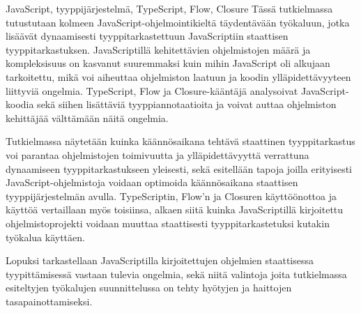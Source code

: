 \documentclass[a4paper, 12pt]{report}
\begin{document}
  \begin{ittiivis}{JavaScript, tyyppijärjestelmä, TypeScript, Flow, Closure}
Tässä tutkielmassa tutustutaan kolmeen JavaScript-ohjelmointikieltä
täydentävään työkaluun, jotka lisäävät dynaamisesti tyyppitarkastettuun
JavaScriptiin staattisen tyyppitarkastuksen. JavaScriptillä kehitettävien
ohjelmistojen määrä ja kompleksisuus on kasvanut suuremmaksi kuin mihin
JavaScript oli alkujaan tarkoitettu, mikä voi aiheuttaa ohjelmiston
laatuun ja koodin ylläpidettävyyteen liittyviä ongelmia.
TypeScript, Flow ja Closure-kääntäjä analysoivat JavaScript-koodia sekä
siihen lisättäviä tyyppiannotaatioita ja voivat auttaa ohjelmiston kehittäjää
välttämään näitä ongelmia.

Tutkielmassa näytetään kuinka käännösaikana tehtävä staattinen tyyppitarkastus
voi parantaa ohjelmistojen toimivuutta ja ylläpidettävyyttä verrattuna
dynaamiseen tyyppitarkastukseen yleisesti, sekä esitellään tapoja joilla
erityisesti JavaScript-ohjelmistoja voidaan optimoida käännösaikana
staattisen tyyppijärjestelmän avulla. TypeScriptin, Flow'n ja Closuren
käyttöönottoa ja käyttöä vertaillaan myös toisiinsa, alkaen siitä kuinka
JavaScriptillä kirjoitettu ohjelmistoprojekti voidaan muuttaa staattisesti
tyyppitarkastetuksi kutakin työkalua käyttäen.

Lopuksi tarkastellaan JavaScriptilla kirjoitettujen ohjelmien staattisessa
tyypittämisessä vastaan tulevia ongelmia, sekä niitä valintoja joita
tutkielmassa esiteltyjen työkalujen suunnittelussa on tehty hyötyjen
ja haittojen tasapainottamiseksi.
  \end{ittiivis}
  

  \tableofcontents
  \clearpage
  
  
  \startpages
\end{document}
